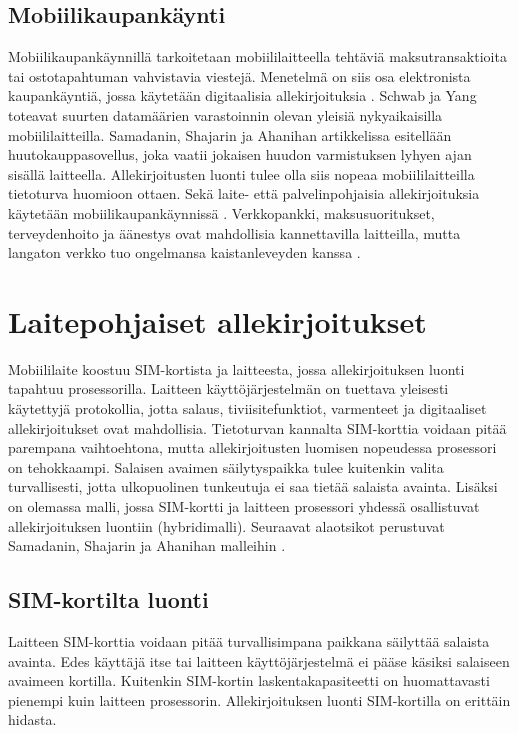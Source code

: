 \documentclass[finnish]{tktltiki2}
\theoremstyle{definition}
\theoremstyle{remark}
\begin{document}
\subsection{Mobiilikaupankäynti}

Mobiilikaupankäynnillä tarkoitetaan mobiililaitteella tehtäviä maksutransaktioita tai ostotapahtuman vahvistavia viestejä. Menetelmä on siis osa elektronista kaupankäyntiä, jossa käytetään digitaalisia allekirjoituksia \cite{e-c}. Schwab ja Yang toteavat  \cite{enti} suurten datamäärien varastoinnin olevan yleisiä nykyaikaisilla mobiililaitteilla. Samadanin, Shajarin ja Ahanihan artikkelissa \cite{proxy} esitellään huutokauppasovellus, joka vaatii jokaisen huudon varmistuksen lyhyen ajan sisällä laitteella. Allekirjoitusten luonti tulee olla siis nopeaa mobiililaitteilla tietoturva huomioon ottaen. Sekä laite- että palvelinpohjaisia allekirjoituksia käytetään mobiilikaupankäynnissä \cite{proxy}. Verkkopankki, maksusuoritukset, terveydenhoito ja äänestys ovat mahdollisia kannettavilla laitteilla, mutta langaton verkko tuo ongelmansa kaistanleveyden kanssa \cite{ECC}. 



\section{Laitepohjaiset allekirjoitukset}

Mobiililaite koostuu SIM-kortista ja laitteesta, jossa allekirjoituksen luonti tapahtuu prosessorilla. Laitteen käyttöjärjestelmän on tuettava yleisesti käytettyjä protokollia, jotta salaus, tiviisitefunktiot, varmenteet ja digitaaliset allekirjoitukset ovat mahdollisia. Tietoturvan kannalta SIM-korttia voidaan pitää parempana vaihtoehtona, mutta allekirjoitusten luomisen nopeudessa prosessori on tehokkaampi. Salaisen avaimen säilytyspaikka tulee kuitenkin valita turvallisesti, jotta ulkopuolinen tunkeutuja ei saa tietää salaista avainta. Lisäksi on olemassa malli, jossa SIM-kortti ja laitteen prosessori yhdessä osallistuvat allekirjoituksen luontiin (hybridimalli). Seuraavat alaotsikot perustuvat Samadanin, Shajarin ja Ahanihan malleihin \cite{proxy}. 
 
\subsection{SIM-kortilta luonti}

Laitteen SIM-korttia voidaan pitää turvallisimpana paikkana säilyttää salaista avainta. Edes käyttäjä itse tai laitteen käyttöjärjestelmä ei pääse käsiksi salaiseen avaimeen kortilla. Kuitenkin SIM-kortin laskentakapasiteetti on huomattavasti pienempi kuin laitteen prosessorin. Allekirjoituksen luonti SIM-kortilla on erittäin hidasta.   
\end{document}
